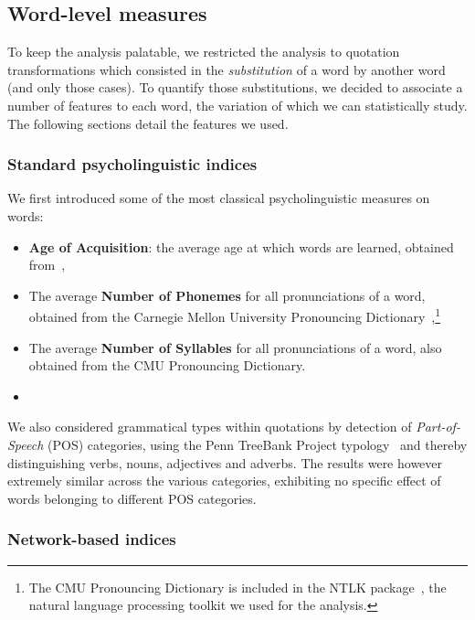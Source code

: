 \subsection{Word-level measures}

To keep the analysis palatable, we restricted the analysis to quotation transformations which consisted in the \emph{substitution} of a word by another word (and only those cases).
To quantify those substitutions, we decided to associate a number of features to each word, the variation of which we can statistically study.
The following sections detail the features we used.

\subsubsection{Standard psycholinguistic indices}

We first introduced some of the most classical psycholinguistic measures on words:

\begin{itemize}
    \item \textbf{Age of Acquisition}: the average age at which words are learned, obtained from~\citet{kuperman12},
    \item The average \textbf{Number of Phonemes} for all pronunciations of a word, obtained from the Carnegie Mellon University Pronouncing Dictionary~\citep{Weide98},\footnote{The CMU Pronouncing Dictionary is included in the NTLK package~\citep{Bird09}, the natural language processing toolkit we used for the analysis.}
    \item The average \textbf{Number of Syllables} for all pronunciations of a word, also obtained from the CMU Pronouncing Dictionary.
    \item {}
\end{itemize}

We also considered grammatical types within quotations by detection of \emph{Part-of-Speech} (POS) categories, using the Penn TreeBank Project typology~\citep{Santorini90} and thereby distinguishing verbs, nouns, adjectives and adverbs.
The results were however extremely similar across the various categories, exhibiting no specific effect of words belonging to different POS categories.

\subsubsection{Network-based indices}


